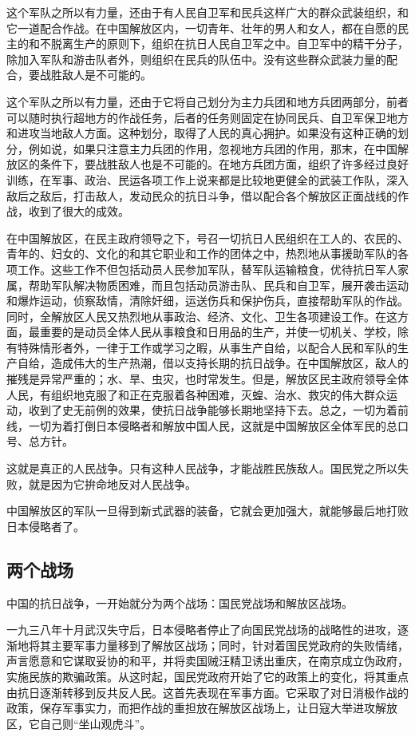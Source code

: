 这个军队之所以有力量，还由于有人民自卫军和民兵这样广大的群众武装组织，和它一道配合作战。在中国解放区内，一切青年、壮年的男人和女人，都在自愿的民主的和不脱离生产的原则下，组织在抗日人民自卫军之中。自卫军中的精干分子，除加入军队和游击队者外，则组织在民兵的队伍中。没有这些群众武装力量的配合，要战胜敌人是不可能的。

这个军队之所以有力量，还由于它将自己划分为主力兵团和地方兵团两部分，前者可以随时执行超地方的作战任务，后者的任务则固定在协同民兵、自卫军保卫地方和进攻当地敌人方面。这种划分，取得了人民的真心拥护。如果没有这种正确的划分，例如说，如果只注意主力兵团的作用，忽视地方兵团的作用，那末，在中国解放区的条件下，要战胜敌人也是不可能的。在地方兵团方面，组织了许多经过良好训练，在军事、政治、民运各项工作上说来都是比较地更健全的武装工作队，深入敌后之敌后，打击敌人，发动民众的抗日斗争，借以配合各个解放区正面战线的作战，收到了很大的成效。

在中国解放区，在民主政府领导之下，号召一切抗日人民组织在工人的、农民的、青年的、妇女的、文化的和其它职业和工作的团体之中，热烈地从事援助军队的各项工作。这些工作不但包括动员人民参加军队，替军队运输粮食，优待抗日军人家属，帮助军队解决物质困难，而且包括动员游击队、民兵和自卫军，展开袭击运动和爆炸运动，侦察敌情，清除奸细，运送伤兵和保护伤兵，直接帮助军队的作战。同时，全解放区人民又热烈地从事政治、经济、文化、卫生各项建设工作。在这方面，最重要的是动员全体人民从事粮食和日用品的生产，并使一切机关、学校，除有特殊情形者外，一律于工作或学习之暇，从事生产自给，以配合人民和军队的生产自给，造成伟大的生产热潮，借以支持长期的抗日战争。在中国解放区，敌人的摧残是异常严重的；水、旱、虫灾，也时常发生。但是，解放区民主政府领导全体人民，有组织地克服了和正在克服着各种困难，灭蝗、治水、救灾的伟大群众运动，收到了史无前例的效果，使抗日战争能够长期地坚持下去。总之，一切为着前线，一切为着打倒日本侵略者和解放中国人民，这就是中国解放区全体军民的总口号、总方针。

这就是真正的人民战争。只有这种人民战争，才能战胜民族敌人。国民党之所以失败，就是因为它拚命地反对人民战争。

中国解放区的军队一旦得到新式武器的装备，它就会更加强大，就能够最后地打败日本侵略者了。

\subsection{两个战场}

中国的抗日战争，一开始就分为两个战场：国民党战场和解放区战场。

一九三八年十月武汉失守后，日本侵略者停止了向国民党战场的战略性的进攻，逐渐地将其主要军事力量移到了解放区战场；同时，针对着国民党政府的失败情绪，声言愿意和它谋取妥协的和平，并将卖国贼汪精卫诱出重庆，在南京成立伪政府，实施民族的欺骗政策。从这时起，国民党政府开始了它的政策上的变化，将其重点由抗日逐渐转移到反共反人民。这首先表现在军事方面。它采取了对日消极作战的政策，保存军事实力，而把作战的重担放在解放区战场上，让日寇大举进攻解放区，它自己则“坐山观虎斗”。

